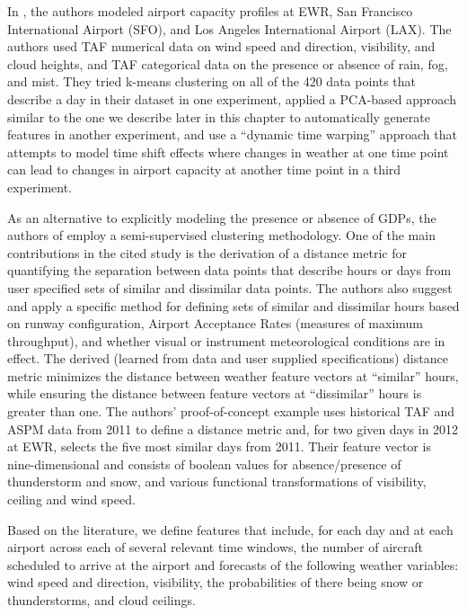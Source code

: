 \documentclass[11pt]{scrartcl}
\begin{document}
In \cite{buxi2011generating}, the authors modeled airport capacity profiles at EWR, San Francisco International Airport (SFO), and Los Angeles International Airport (LAX).  The authors used TAF numerical data on wind speed and direction, visibility, and cloud heights, and TAF categorical data on the presence or absence of rain, fog, and mist.  They tried k-means clustering on all of the 420 data points that describe a day in their dataset in one experiment, applied a PCA-based approach similar to the one we describe later in this chapter to automatically generate features in another experiment, and use a ``dynamic time warping'' approach that attempts to model time shift effects where changes in weather at one time point can lead to changes in airport capacity at another time point in a third experiment.

As an alternative to explicitly modeling the presence or absence of GDPs, the authors of \cite{liu2014} employ a semi-supervised clustering methodology.  One of the main contributions in the cited study is the derivation of a distance metric for quantifying the separation between data points that describe hours or days from user specified sets of similar and dissimilar data points.  The authors also suggest and apply a specific method for defining sets of similar and dissimilar hours based on runway configuration, Airport Acceptance Rates (measures of maximum throughput), and whether visual or instrument meteorological conditions are in effect.  The derived (learned from data and user supplied specifications) distance metric minimizes the distance between weather feature vectors at ``similar'' hours, while ensuring the distance between feature vectors at ``dissimilar'' hours is greater than one. The authors' proof-of-concept example uses historical TAF and ASPM data from 2011 to define a distance metric and, for two given days in 2012 at EWR, selects the five most similar days from 2011.  Their feature vector is nine-dimensional and consists of boolean values for absence/presence of thunderstorm and snow, and various functional transformations of visibility, ceiling and wind speed.

Based on the literature, we define features that include, for each day and at each airport across each of several relevant time windows, the number of aircraft scheduled to arrive at the airport and forecasts of the following weather variables: wind speed and direction, visibility, the probabilities of there being snow or thunderstorms, and cloud ceilings.
 
\end{document}
